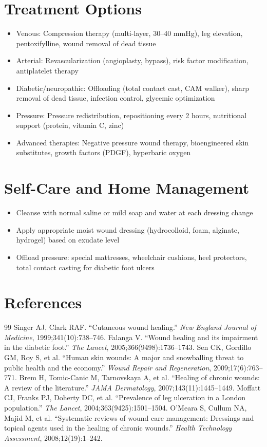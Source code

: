 \section*{Treatment Options}
\begin{itemize}
  \item Venous: Compression therapy (multi-layer, 30--40 mmHg), leg elevation, pentoxifylline, wound removal of dead tissue
  \item Arterial: Revascularization (angioplasty, bypass), risk factor modification, antiplatelet therapy
  \item Diabetic/neuropathic: Offloading (total contact cast, CAM walker), sharp removal of dead tissue, infection control, glycemic optimization
  \item Pressure: Pressure redistribution, repositioning every 2 hours, nutritional support (protein, vitamin C, zinc)
  \item Advanced therapies: Negative pressure wound therapy, bioengineered skin substitutes, growth factors (PDGF), hyperbaric oxygen
\end{itemize}

\section*{Self-Care and Home Management}
\begin{itemize}
  \item Cleanse with normal saline or mild soap and water at each dressing change
  \item Apply appropriate moist wound dressing (hydrocolloid, foam, alginate, hydrogel) based on exudate level
  \item Offload pressure: special mattresses, wheelchair cushions, heel protectors, total contact casting for diabetic foot ulcers
\end{itemize}

\section*{References}
\begin{thebibliography}{99}
 Singer AJ, Clark RAF. ``Cutaneous wound healing.'' \textit{New England Journal of Medicine}, 1999;341(10):738--746.
 Falanga V. ``Wound healing and its impairment in the diabetic foot.'' \textit{The Lancet}, 2005;366(9498):1736--1743.
 Sen CK, Gordillo GM, Roy S, et al. ``Human skin wounds: A major and snowballing threat to public health and the economy.'' \textit{Wound Repair and Regeneration}, 2009;17(6):763--771.
 Brem H, Tomic-Canic M, Tarnovskaya A, et al. ``Healing of chronic wounds: A review of the literature.'' \textit{JAMA Dermatology}, 2007;143(11):1445--1449.
 Moffatt CJ, Franks PJ, Doherty DC, et al. ``Prevalence of leg ulceration in a London population.'' \textit{The Lancet}, 2004;363(9425):1501--1504.
 O'Meara S, Cullum NA, Majid M, et al. ``Systematic reviews of wound care management: Dressings and topical agents used in the healing of chronic wounds.'' \textit{Health Technology Assessment}, 2008;12(19):1--242.
\end{thebibliography}
